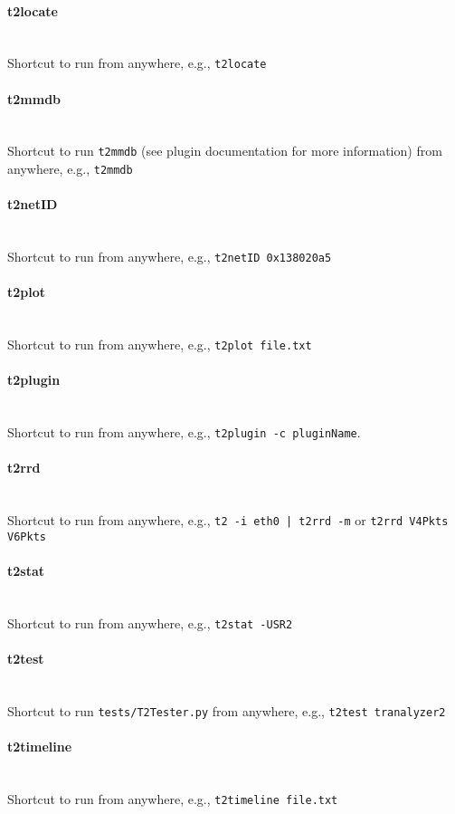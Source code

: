\documentclass[documentation]{subfiles}
\begin{document}
\paragraph{t2locate}~\\
Shortcut to run  from anywhere, e.g., {\tt t2locate}
\paragraph{t2mmdb}~\\
Shortcut to run {\tt t2mmdb} (see  plugin documentation for more information) from anywhere, e.g., {\tt t2mmdb}
\paragraph{t2netID}~\\
Shortcut to run  from anywhere, e.g., {\tt t2netID 0x138020a5}
\paragraph{t2plot}~\\
Shortcut to run  from anywhere, e.g., {\tt t2plot file.txt}
\paragraph{t2plugin}~\\
Shortcut to run  from anywhere, e.g., {\tt t2plugin -c pluginName}.
\paragraph{t2rrd}~\\
Shortcut to run  from anywhere, e.g., {\tt t2 -i eth0 | t2rrd -m} or {\tt t2rrd V4Pkts V6Pkts}
\paragraph{t2stat}~\\
Shortcut to run  from anywhere, e.g., {\tt t2stat -USR2}
\paragraph{t2test}~\\
Shortcut to run {\tt tests/T2Tester.py} from anywhere, e.g., {\tt t2test tranalyzer2}
\paragraph{t2timeline}~\\
Shortcut to run  from anywhere, e.g., {\tt t2timeline file.txt}
\end{document}
